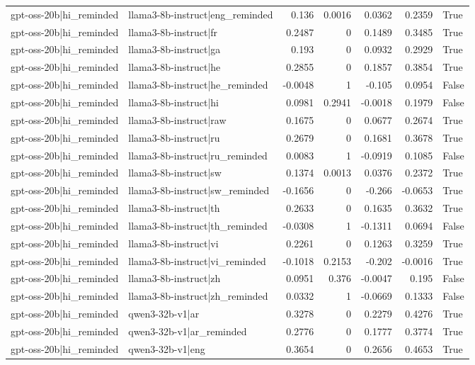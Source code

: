 \begin{table}
\begin{tabular}{l l r r r r l}
gpt-oss-20b|hi_reminded & llama3-8b-instruct|eng_reminded & 0.136 & 0.0016 & 0.0362 & 0.2359 & True \\
gpt-oss-20b|hi_reminded & llama3-8b-instruct|fr & 0.2487 & 0 & 0.1489 & 0.3485 & True \\
gpt-oss-20b|hi_reminded & llama3-8b-instruct|ga & 0.193 & 0 & 0.0932 & 0.2929 & True \\
gpt-oss-20b|hi_reminded & llama3-8b-instruct|he & 0.2855 & 0 & 0.1857 & 0.3854 & True \\
gpt-oss-20b|hi_reminded & llama3-8b-instruct|he_reminded & -0.0048 & 1 & -0.105 & 0.0954 & False \\
gpt-oss-20b|hi_reminded & llama3-8b-instruct|hi & 0.0981 & 0.2941 & -0.0018 & 0.1979 & False \\
gpt-oss-20b|hi_reminded & llama3-8b-instruct|raw & 0.1675 & 0 & 0.0677 & 0.2674 & True \\
gpt-oss-20b|hi_reminded & llama3-8b-instruct|ru & 0.2679 & 0 & 0.1681 & 0.3678 & True \\
gpt-oss-20b|hi_reminded & llama3-8b-instruct|ru_reminded & 0.0083 & 1 & -0.0919 & 0.1085 & False \\
gpt-oss-20b|hi_reminded & llama3-8b-instruct|sw & 0.1374 & 0.0013 & 0.0376 & 0.2372 & True \\
gpt-oss-20b|hi_reminded & llama3-8b-instruct|sw_reminded & -0.1656 & 0 & -0.266 & -0.0653 & True \\
gpt-oss-20b|hi_reminded & llama3-8b-instruct|th & 0.2633 & 0 & 0.1635 & 0.3632 & True \\
gpt-oss-20b|hi_reminded & llama3-8b-instruct|th_reminded & -0.0308 & 1 & -0.1311 & 0.0694 & False \\
gpt-oss-20b|hi_reminded & llama3-8b-instruct|vi & 0.2261 & 0 & 0.1263 & 0.3259 & True \\
gpt-oss-20b|hi_reminded & llama3-8b-instruct|vi_reminded & -0.1018 & 0.2153 & -0.202 & -0.0016 & True \\
gpt-oss-20b|hi_reminded & llama3-8b-instruct|zh & 0.0951 & 0.376 & -0.0047 & 0.195 & False \\
gpt-oss-20b|hi_reminded & llama3-8b-instruct|zh_reminded & 0.0332 & 1 & -0.0669 & 0.1333 & False \\
gpt-oss-20b|hi_reminded & qwen3-32b-v1|ar & 0.3278 & 0 & 0.2279 & 0.4276 & True \\
gpt-oss-20b|hi_reminded & qwen3-32b-v1|ar_reminded & 0.2776 & 0 & 0.1777 & 0.3774 & True \\
gpt-oss-20b|hi_reminded & qwen3-32b-v1|eng & 0.3654 & 0 & 0.2656 & 0.4653 & True \\

\end{tabular}
\end{table}
